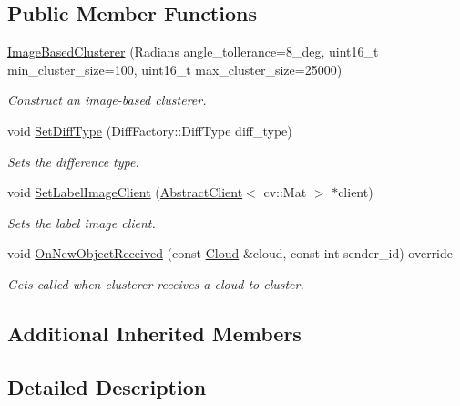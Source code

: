 \subsection*{Public Member Functions}
\begin{DoxyCompactItemize}
\item 
\hyperlink{classdepth__clustering_1_1ImageBasedClusterer_a6a8bdd77542e14ee420988ad80579f35}{Image\-Based\-Clusterer} (Radians angle\-\_\-tollerance=8\-\_\-deg, uint16\-\_\-t min\-\_\-cluster\-\_\-size=100, uint16\-\_\-t max\-\_\-cluster\-\_\-size=25000)
\begin{DoxyCompactList}\small\item\em Construct an image-\/based clusterer. \end{DoxyCompactList}\item 
void \hyperlink{classdepth__clustering_1_1ImageBasedClusterer_a0dd114829041816d309d6c8f9ff41cad}{Set\-Diff\-Type} (Diff\-Factory\-::\-Diff\-Type diff\-\_\-type)
\begin{DoxyCompactList}\small\item\em Sets the difference type. \end{DoxyCompactList}\item 
void \hyperlink{classdepth__clustering_1_1ImageBasedClusterer_a6af0de0dad7450c34c655fb447886716}{Set\-Label\-Image\-Client} (\hyperlink{classdepth__clustering_1_1AbstractClient}{Abstract\-Client}$<$ cv\-::\-Mat $>$ $\ast$client)
\begin{DoxyCompactList}\small\item\em Sets the label image client. \end{DoxyCompactList}\item 
void \hyperlink{classdepth__clustering_1_1ImageBasedClusterer_a825e11bfc35a0eeeac03341924ce3227}{On\-New\-Object\-Received} (const \hyperlink{classdepth__clustering_1_1Cloud}{Cloud} \&cloud, const int sender\-\_\-id) override
\begin{DoxyCompactList}\small\item\em Gets called when clusterer receives a cloud to cluster. \end{DoxyCompactList}\end{DoxyCompactItemize}
\subsection*{Additional Inherited Members}


\subsection{Detailed Description}
